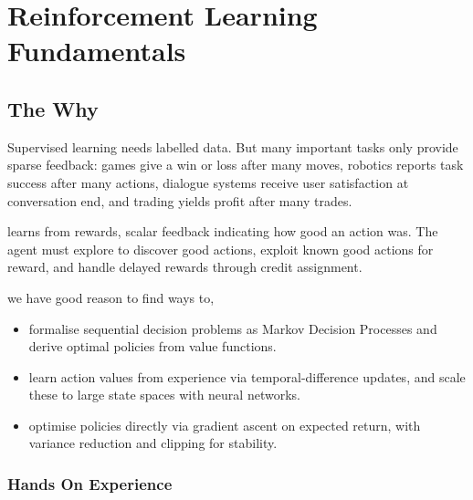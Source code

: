
\chapter{Reinforcement Learning Fundamentals}


\section{The Why}


Supervised learning needs labelled data. But many important tasks only provide sparse feedback: games give a win or loss after many moves, robotics reports task success after many actions, dialogue systems receive user satisfaction at conversation end, and trading yields profit after many trades.

 learns from rewards, scalar feedback indicating how good an action was. The agent must explore to discover good actions, exploit known good actions for reward, and handle delayed rewards through credit assignment.

 we have good reason to find ways to,
\begin{itemize}
    \item formalise sequential decision problems as Markov Decision Processes and derive optimal policies from value functions.
    \item learn action values from experience via temporal-difference updates, and scale these to large state spaces with neural networks.
    \item optimise policies directly via gradient ascent on expected return, with variance reduction and clipping for stability.
\end{itemize}

\subsection{Hands On Experience}

